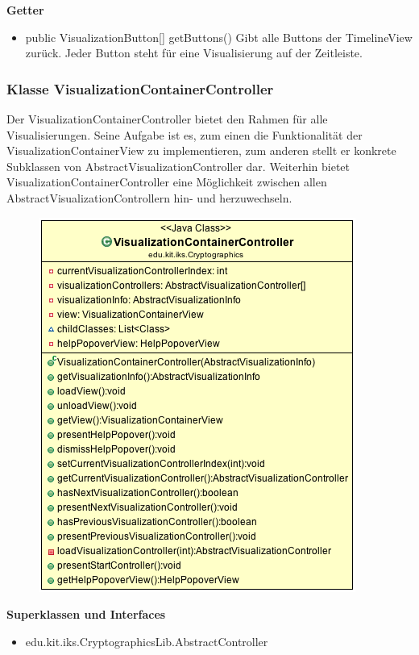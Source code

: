 \documentclass{article}
\begin{document}
      \textbf{Getter}
      \begin{itemize}
        \item public VisualizationButton[] getButtons() \newline
        Gibt alle Buttons der TimelineView zurück. Jeder Button steht für eine Visualisierung auf der Zeitleiste.
      \end{itemize}

    \subsubsection{Klasse VisualizationContainerController}
      Der VisualizationContainerController bietet den Rahmen für alle Visualisierungen. Seine Aufgabe ist es, zum einen die Funktionalität der VisualizationContainerView zu implementieren, zum anderen stellt er konkrete Subklassen von AbstractVisualizationController dar. Weiterhin bietet VisualizationContainerController eine Möglichkeit zwischen allen AbstractVisualizationControllern hin- und herzuwechseln.
      \begin{figure}[H]
        \centering
        \includegraphics{resources/edu-kit-iks-Cryptographics-VisualizationContainerController}
      \end{figure}

      \textbf{Superklassen und Interfaces}
      \begin{itemize}
        \item edu.kit.iks.CryptographicsLib.AbstractController
      \end{itemize}
      
\end{document}
